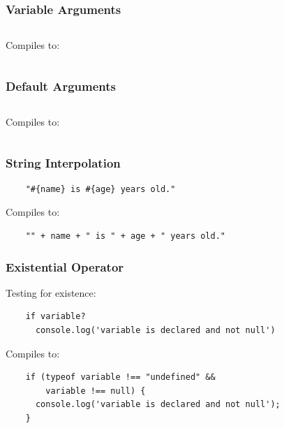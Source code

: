 \documentclass{beamer}
\begin{document}
\begin{frame}
  \frametitle{Variable Arguments}

  \inputminted{coffeescript}{src/vararg.coffee}

  \pause
  \vspace{.5cm}
  Compiles to:
  \vspace{.5cm}

  \inputminted[fontsize=\tiny]{coffeescript}{src/vararg.js}
  
\end{frame}

\begin{frame}
\frametitle{Default  Arguments}

  \inputminted{coffeescript}{src/defvalues.coffee}

  \pause
  \vspace{.5cm}
  Compiles to:
  \vspace{.5cm}

  \inputminted[fontsize=\small]{coffeescript}{src/defvalues.js}

\end{frame}

\begin{frame}[fragile]
  \frametitle{String Interpolation}
 
  \begin{verbatim}
    "#{name} is #{age} years old."
  \end{verbatim}

  \pause
  \vspace{.5cm}
  Compiles to:
  \vspace{.5cm}

  \begin{verbatim}
    "" + name + " is " + age + " years old."
  \end{verbatim}  
\end{frame}

%
%
 \begin{frame}[fragile]
  \frametitle{Existential Operator}

  Testing for existence:

  \begin{verbatim}
    if variable?
      console.log('variable is declared and not null')
  \end{verbatim}

  \pause
  \vspace{.5cm}
  Compiles to:
  \vspace{.5cm}


  \begin{verbatim}
    if (typeof variable !== "undefined" && 
        variable !== null) {
      console.log('variable is declared and not null');
    }
  \end{verbatim}  
\end{frame}
\end{document}
